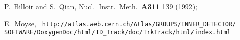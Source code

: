 
\newcommand{\PLB}[3]  {Phys.\ Lett.\ {\bf B#1} #2 (#3)}
\newcommand{\PL}[3]   {Phys.\ Lett.\ {\bf#1} #2 (#3)}
\newcommand{\ZPC}[3]  {Z.\ Phys.\ {\bf C#1} #2 (#3)}
\newcommand{\ZFPC}    {Z.\ Phys.\ C}
\newcommand{\EPC}[3]  {Eur.\ Phys.\ J.\ {\bf C#1} #2 (#3)}
\newcommand{\NIMA}[3] {Nucl.\ Instr.\ Meth.\ {\bf A#1} #2 (#3)}
\newcommand{\PPE}[1]  {CERN-PPE/{#1}}
\newcommand{\PEP}[1]  {CERN-EP/{#1}}
\newcommand{\PRLD}[3] {Phys.\ Rev.\ Lett.\ {\bf D#1} #2 (#3)}
\newcommand{\PRP}[3]  {Phys.\ Rep.\ {\bf#1} #2 (#3)}
\newcommand{\PRL}[3]  {Phys.\ Rev.\ Lett.\ \textbf{#1} #2 (#3)}
\newcommand{\PRD}[3]  {Phys.\ Rev.\ {\bf D#1} #2 (#3)}
\newcommand{\PRX}[3]  {Phys.\ Rev.\ {\bf #1} #2 (#3)}
\newcommand{\NPB}[3]  {Nucl.\ Phys.\ {\bf B#1} #2 (#3)}
\newcommand{\CPC}[3]  {Comp.\ Phys.\ Comm.\ {\bf #1} #2 (#3)}
\newcommand{\IJMP}[3] {Int.\ J.\ Mod.\ Phys.\ {\bf A#1} #2 (#3)}
\newcommand{\NPH}[3]  {Nucl.\ Phys.\ {\bf#1} #2 (#3)}
\newcommand{\APP}[3]  {Acta\ Phys.\ Polon.\ {\bf B#1} #2 (#3)}
\newcommand{\etal}    {{\it et al.}} 

\begin{thebibliography}{99}




  P.~Billoir and S.~Qian, \NIMA{311}{139}{1992}; \newline

  E.~Moyse, {\tt
  http://atlas.web.cern.ch/Atlas/GROUPS/INNER\_DETECTOR/ \newline SOFTWARE/DoxygenDoc/html/ID\_Track/doc/TrkTrack/html/index.html}

\end{thebibliography}






